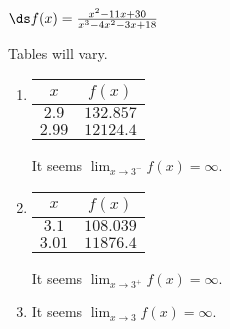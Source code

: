 {$\ds f(x)=\frac{x^2-11 x+30}{x^3-4 x^2-3 x+18}$
}
{Tables will vary.
\begin{enumerate}
\item	
\begin{tabular}{cc}
$x$ & $f(x)$ \\ \hline
$2.9$ & $132.857$ \\
 $2.99$ & $12124.4$ \\
  \end{tabular}
 It seems $\lim_{x\to3^-}f(x) =\infty$.
\item
\begin{tabular}{cc}
$x$ & $f(x)$ \\ \hline
$ 3.1$ & $108.039$ \\
 $3.01$ & $11876.4$ \\
  \end{tabular}
  It seems $\lim_{x\to3^+}f(x) =\infty$.
\item		It seems $\lim_{x\to3}f(x) =\infty$.
\end{enumerate}
}
